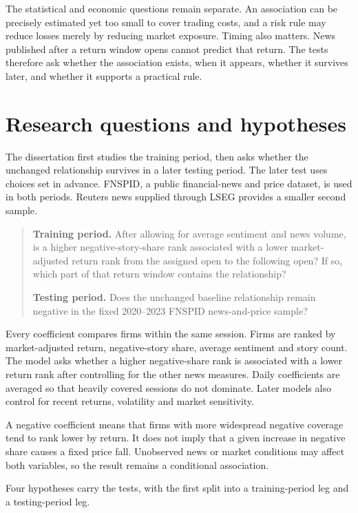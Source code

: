 The statistical and economic questions remain separate. An association can be
precisely estimated yet too small to cover trading costs, and a risk rule may
reduce losses merely by reducing market exposure. Timing also matters. News
published after a return window opens cannot predict that return. The tests
therefore ask whether the association exists, when it appears, whether it
survives later, and whether it supports a practical rule.

\section{Research questions and hypotheses}

The dissertation first studies the training period, then asks whether the
unchanged relationship survives in a later testing period. The later test uses
choices set in advance. FNSPID, a public financial-news and price dataset, is
used in both periods. Reuters news supplied through LSEG provides a smaller
second sample.

\begin{quote}
\textbf{Training period.} After allowing for average sentiment and news volume,
is a higher negative-story-share rank associated with a lower market-adjusted
return rank from the assigned open to the following open? If so, which part of
that return window contains the relationship?

\textbf{Testing period.} Does the unchanged baseline relationship remain
negative in the fixed 2020--2023 FNSPID news-and-price sample?
\end{quote}

Every coefficient compares firms within the same session. Firms are ranked by
market-adjusted return, negative-story share, average sentiment and story count.
The model asks whether a higher negative-share rank is associated with a lower
return rank after controlling for the other news measures. Daily coefficients
are averaged so that heavily covered sessions do not dominate. Later models
also control for recent returns, volatility and market sensitivity.

A negative coefficient means that firms with more widespread negative coverage
tend to rank lower by return. It does not imply that a given increase in
negative share causes a fixed price fall. Unobserved news or market conditions
may affect both variables, so the result remains a conditional association.

Four hypotheses carry the tests, with the first split into a training-period leg and
a testing-period leg.

